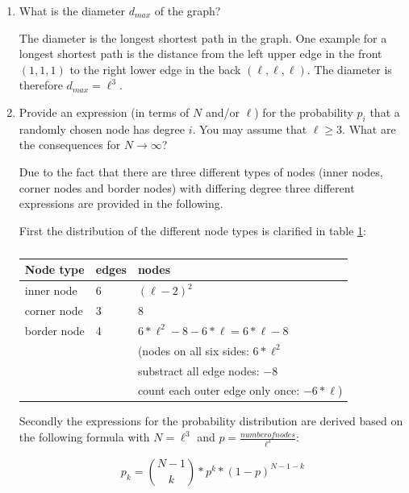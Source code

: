 \begin{enumerate}
	\item What is the diameter $d_{max}$ of the graph?
	\vspace{0.25cm}
	
	The diameter is the longest shortest path in the graph. One example for a longest shortest path is the distance from the left upper edge in the front $(1,1,1)$ to the right lower edge in the back $(\ell,\ell,\ell)$. The diameter is therefore $d_{max} = \ell^3$.
	
	\item Provide an expression (in terms of $N$ and/or $\ell$) for the probability $p_i$ that a randomly chosen node has degree $i$. You may assume that $\ell \geq 3$. What are the consequences for $N \rightarrow \infty$?
	\vspace{0.25cm}
	
	Due to the fact that there are three different types of nodes (inner nodes, corner nodes and border nodes) with differing degree three different expressions are provided in the following.
	
	First the distribution of the different node types is clarified in table \ref{tab:node_distribution}:
	\begin{table}[h!]
	\centering
	\begin{tabular}{l|l|l}
		\hline
		\rowcolor{lightgray}
		Node type & edges & nodes \\ 
		\hline
		inner node    & 6 & $(\ell-2)^2$ \\
		\hline
		corner node    & 3 & $8$ \\
		\hline
		border node    & 4  & $6*\ell^2 - 8 - 6*\ell = 6*\ell - 8$ \\
		& & (nodes on all six sides: $6*\ell^2$ \\
		& & substract all edge nodes: $-8$ \\
		& & count each outer edge only once: $-6*\ell$) \\
		\hline
	\end{tabular}
	\caption{}
	\label{tab:node_distribution}
	\end{table}

	Secondly the expressions for the probability distribution are derived based on the following formula with $N=\ell^3$ and $p=\frac{number of nodes}{\ell^3}$:
	
	\begin{equation}
	p_k = {{N-1}\choose{k}} * p^k * (1-p)^{N-1-k}
	\end{equation}
	

\end{enumerate}
